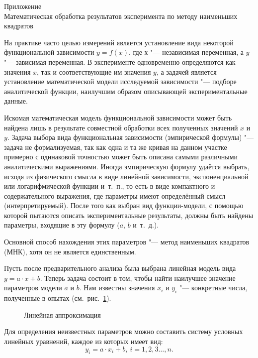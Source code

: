 \documentclass[a4paper, 12pt]{extarticle}
\begin{document}
\newpage
Приложение\\
Математическая обработка результатов эксперимента по методу наименьших квадратов %

На практике часто целью измерений является установление вида некоторой функциональной зависимости $y = f(x)$, где $х$ "--- независимая переменная, а $y$ "--- зависимая переменная. В эксперименте одновременно определяются как значения $x$, так и соответствующие им значения $y$, а задачей является установление математической модели исследуемой зависимости "--- подборе аналитической функции, наилучшим образом описывающей экспериментальные данные.

Искомая математическая модель функциональной зависимости может быть найдена лишь в результате совместной обработки всех полученных значений $x$ и $y$. Задача выбора вида функциональная зависимости (эмпирической формулы) "--- задача не формализуемая, так как одна и та же кривая на данном участке примерно с одинаковой точностью может быть описана самыми различными аналитическими выражениями. Иногда эмпирическую формулу удаётся выбрать, исходя из физического смысла в виде линейной зависимости, экспоненциальной или логарифмической функции и~т.~п., то есть в виде компактного и содержательного выражения, где параметры имеют определённый смысл (интерпретируемый). После того как выбран вид функции-модели, с помощью которой пытаются описать экспериментальные результаты, должны быть найдены параметры, входящие в эту формулу ($a$, $b$ и~т.~д.). 

Основной способ нахождения этих параметров "--- метод наименьших квадратов (МНК), хотя он не является единственным. 

Пусть после предварительного анализа была выбрана линейная модель вида $y=a \cdot x + b$. Теперь задача состоит в том, чтобы найти наилучшее значение параметров модели $a$ и $b$. Нам известны значения $x_i$ и $y_i$ "--- конкретные числа, полученные в опытах (см.~рис.~\ref{fig:m11-linear-approx}). 

\begin{figure}[h]
\begin{center}
\end{center}
\caption{Линейная аппроксимация \label{fig:m11-linear-approx}}
\end{figure}

Для определения неизвестных параметров можно составить систему условных линейных уравнений, каждое из которых имеет вид:
\begin{equation}
\label{eq:m11-linear-approx}
y_i = a \cdot x_i + b,\ i = 1, 2, 3 \ldots, n. %
\end{equation}
\end{document}
